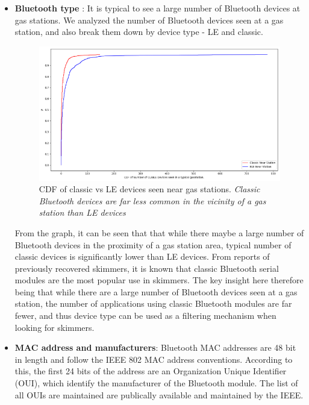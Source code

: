 \begin{itemize}
    \item \textbf{Bluetooth type} : It is typical to see a large number of
Bluetooth devices at gas stations. We analyzed the number of Bluetooth devices
seen at a gas station, and also break them down by device type - LE and classic.

	\begin{figure}[h] \centering
\includegraphics[width=1\columnwidth]{fig/cdfs_classic_ble.png}
  	\caption{CDF of classic vs LE devices seen near gas
stations. \textit{Classic Bluetooth devices are far less common in the vicinity
of a gas station than LE devices}}
  	\label{fig:cdf_classic_le}
	\end{figure}

	From the graph, it can be seen that that while there maybe a large
number of Bluetooth devices in the proximity of a gas station area, typical
number of classic devices is significantly lower than LE devices. From reports
of previously recovered skimmers, it is known that classic Bluetooth serial
modules are the most popular use in skimmers. The key insight here therefore
being that while there are a large number of Bluetooth devices seen at a gas
station, the number of applications using classic Bluetooth modules are far
fewer, and thus device type can be used as a filtering mechanism when looking
for skimmers.
	\item \textbf{MAC address and manufacturers}: Bluetooth MAC addresses
are 48 bit in length and follow the IEEE 802 MAC address conventions. According
to this, the first 24 bits of the address are an Organization Unique Identifier
(OUI), which identify the manufacturer of the Bluetooth module. The list of all
OUIs are maintained are publically available and maintained by the
IEEE. 


\end{itemize}
